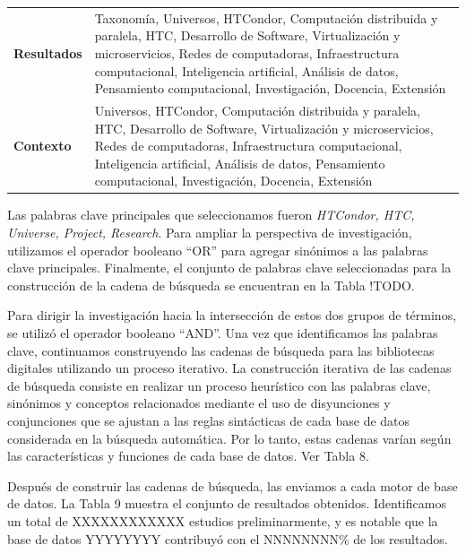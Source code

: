 \begin{table}[htbp]
\begin{tabular}{p{1.8cm}p{5.7cm}}
        \addlinespace[0.8em]
        \textbf{Resultados              } & Taxonomía, Universos, HTCondor, Computación distribuida y paralela, HTC, Desarrollo de Software, Virtualización y microservicios, Redes de computadoras, Infraestructura computacional, Inteligencia artificial, Análisis de datos, Pensamiento computacional, Investigación, Docencia, Extensión                                                                                                                                                                                                                                            \\
        \addlinespace[0.8em]
        \textbf{Contexto}                & Universos, HTCondor, Computación distribuida y paralela, HTC, Desarrollo de Software, Virtualización y microservicios, Redes de computadoras, Infraestructura computacional, Inteligencia artificial, Análisis de datos, Pensamiento computacional, Investigación, Docencia, Extensión \\
        \bottomrule
    \end{tabular}
\end{table}



Las palabras clave principales que seleccionamos fueron \textit{HTCondor, HTC, Universe, Project, Research}. Para ampliar la perspectiva de investigación, utilizamos el operador booleano ``OR'' para agregar sinónimos a las palabras clave principales.
Finalmente, el conjunto de palabras clave seleccionadas para la construcción de la cadena de búsqueda se encuentran en la Tabla !TODO.

Para dirigir la investigación hacia la intersección de estos dos grupos de términos, se utilizó el operador booleano ``AND''. Una vez que identificamos las palabras clave, continuamos construyendo las cadenas de búsqueda para las bibliotecas digitales utilizando un proceso iterativo. La construcción iterativa de las cadenas de búsqueda consiste en realizar un proceso heurístico con las palabras clave, sinónimos y conceptos relacionados mediante el uso de disyunciones y conjunciones que se ajustan a las reglas sintácticas de cada base de datos considerada en la búsqueda automática. Por lo tanto, estas cadenas varían según las características y funciones de cada base de datos. Ver Tabla 8.

Después de construir las cadenas de búsqueda, las enviamos a cada motor de base de datos. La Tabla 9 muestra el conjunto de resultados obtenidos. Identificamos un total de XXXXXXXXXXXX estudios preliminarmente, y es notable que la base de datos  YYYYYYYY contribuyó con el NNNNNNNN\% de los resultados.




